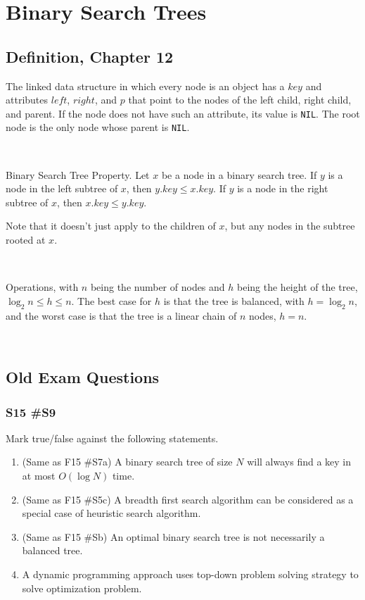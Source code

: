 \section{Binary Search Trees}

\subsection{Definition, Chapter 12}


The linked data structure in which every node is an object has a $key$ and attributes $left$, $right$, and $p$ that point to the nodes of the left child, right child, and parent.  If the node does not have such an attribute, its value is \verb|NIL|.  The root node is the only node whose parent is \verb|NIL|.

\

Binary Search Tree Property.  Let $x$ be a node in a binary search tree.  If $y$ is a node in the left subtree of $x$, then $y.key \le x.key$.  If $y$ is a node in the right subtree of $x$, then $x.key \le y.key$.  

Note that it doesn't just apply to the children of $x$, but any nodes in the subtree rooted at $x$.  

\

Operations, with $n$ being the number of nodes and $h$ being the height of the tree, $\log_2 n \le h \le n$.  The best case for $h$ is that the tree is balanced, with $h = \log_2 n$, and the worst case is that the tree is a linear chain of $n$ nodes, $h = n$.  

\


\subsection{Old Exam Questions}
\subsubsection{S15 \#S9}

	Mark true/false against the following statements. 
	\begin{enumerate}[label=\alph*.]
		\item (Same as F15 \#S7a) A binary search tree of size $N$ will always find a key in at most $O(\log N)$ time.
		\item (Same as F15 \#S5c) A breadth first search algorithm can be considered as a special case of heuristic search algorithm.
		\item (Same as F15 \#Sb)  An optimal binary search tree is not necessarily a balanced tree.
		\item A dynamic programming approach uses top-down problem solving strategy to solve optimization problem.
	\end{enumerate}

